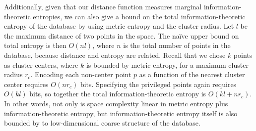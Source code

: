 \documentclass[review,preprint,12pt]{elsarticle}
\theoremstyle{definition}
\theoremstyle{remark}
\begin{document}
Additionally, given that our distance function measures marginal information-theoretic entropies, we can also give a bound on the total information-theoretic entropy of the database by using metric entropy and the cluster radius.
Let $l$ be the maximum distance of two points in the space.
The na\"ive upper bound on total entropy is then $O(nl)$, where $n$ is the total number of points in the database, because distance and entropy are related.
Recall that we chose $k$ points as cluster centers, where $k$ is bounded by metric entropy, for a maximum cluster radius $r_c$.
Encoding each non-center point $p$ as a function of the nearest cluster center requires $O(n  r_c)$ bits.
Specifying the privileged points again requires $O(kl)$ bits, so together the total information-theoretic entropy is $O(kl + n r_c)$.
In other words, not only is space complexity linear in metric entropy plus information-theoretic entropy, but information-theoretic entropy itself is also bounded by to low-dimensional coarse structure of the database.
\end{document}
